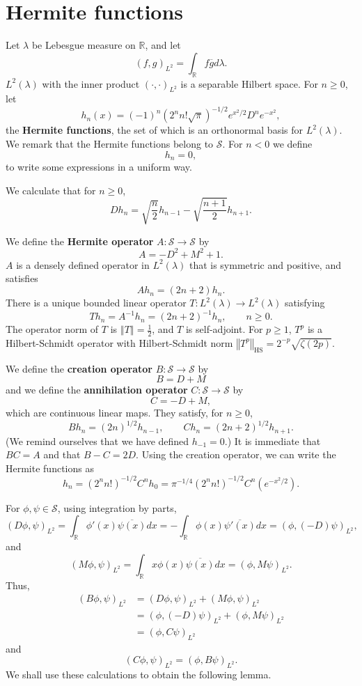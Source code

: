 \documentclass{article}
\newcommand{\norm}[1]{\left\Vert #1 \right\Vert}
\newcommand{\HS}[1]{\left\Vert #1 \right\Vert_{\mathrm{HS}}}
\theoremstyle{definition}
\begin{document}
 


\section{Hermite functions}
Let $\lambda$ be Lebesgue measure on $\mathbb{R}$,
and let 
\[
(f,g)_{L^2} = \int_{\mathbb{R}} f \overline{g} d\lambda.
\]
$L^2(\lambda)$ with the inner product $(\cdot,\cdot)_{L^2}$ is a separable Hilbert space. 
For $n \geq 0$, let
\[
h_n(x) = (-1)^n(2^n n! \sqrt{\pi})^{-1/2} e^{x^2/2} D^n e^{-x^2},
\]
the \textbf{Hermite functions}, the set of which is an orthonormal basis for $L^2(\lambda)$.
We remark that the Hermite functions belong to $\mathscr{S}$.
For $n<0$ we define
\[
h_n=0,
\]
to write some expressions in a uniform way.

We calculate that for $n \geq 0$,
\[
Dh_n = \sqrt{\frac{n}{2}} h_{n-1}-\sqrt{\frac{n+1}{2}} h_{n+1}.
\]


We define the \textbf{Hermite operator} $A:\mathscr{S} \to \mathscr{S}$ by
\[
A=-D^2+M^2+1.
\]
$A$ is a densely defined operator in $L^2(\lambda)$ that is symmetric and positive, and  satisfies
\[
Ah_n = (2n+2)h_n.
\]
There is a unique bounded linear operator $T:L^2(\lambda) \to L^2(\lambda)$ satisfying
\[
Th_n=A^{-1}h_n = (2n+2)^{-1} h_n,\qquad n \geq 0.
\]
The operator norm of $T$ is $\norm{T}=\frac{1}{2}$, and $T$ is self-adjoint. For $p \geq 1$, 
$T^p$ is a Hilbert-Schmidt operator with Hilbert-Schmidt norm $\HS{T^p}=2^{-p} \sqrt{\zeta(2p)}$. 

We define the \textbf{creation operator} $B:\mathscr{S} \to \mathscr{S}$ by
\[
B=D+M
\]
and we define the \textbf{annihilation operator} $C:\mathscr{S} \to \mathscr{S}$ by
\[
C=-D+M,
\]
which are continuous linear maps. They satisfy, for $n \geq 0$,
\[
Bh_n = (2n)^{1/2}h_{n-1},\qquad Ch_n=(2n+2)^{1/2}h_{n+1}.
\]
(We remind ourselves that we have defined $h_{-1}=0$.)
It is immediate that $BC=A$ and that $B-C=2D$. 
Using the creation operator, we can write the Hermite functions as
\[
h_n=(2^n n!)^{-1/2} C^n h_0 = \pi^{-1/4} (2^n n!)^{-1/2} C^n(e^{-x^2/2}).
\]

For $\phi,\psi \in \mathscr{S}$, using integration by parts,
\[
(D\phi,\psi)_{L^2}=\int_{\mathbb{R}} \phi'(x) \overline{\psi(x)} dx
=-\int_{\mathbb{R}} \phi(x) \overline{\psi'(x)} dx
=(\phi,(-D)\psi)_{L^2},
\]
and 
\[
(M\phi,\psi)_{L^2}=\int_{\mathbb{R}} x \phi(x) \overline{\psi(x)} dx
=(\phi,M\psi)_{L^2}.
\]
Thus,
\begin{align*}
(B\phi,\psi)_{L^2}&=(D\phi,\psi)_{L^2} + (M\phi,\psi)_{L^2}\\
&=(\phi,(-D)\psi)_{L^2}+(\phi,M\psi)_{L^2}\\
&=(\phi,C\psi)_{L^2}
\end{align*}
and
\[
(C\phi,\psi)_{L^2}=(\phi,B\psi)_{L^2}.
\]
We shall use these calculations to obtain the following lemma.
\end{document}
